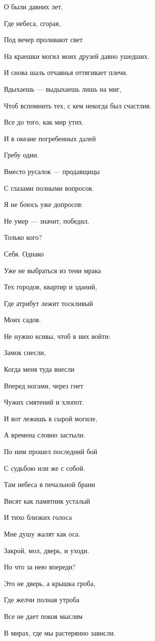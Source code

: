 \documentclass[
  a5paperpaper,
  DIV=11,
  numbers=noendperiod]{scrreprt}
\begin{document}
О были давних лет,

Где небеса, сгорая,

Под вечер проливают свет

На краешки могил моих друзей давно ушедших.

И снова шаль отчаянья оттягивает плечи.

Вдыхаешь --- выдыхаешь лишь на миг,

Чтоб вспомнить тех, с кем некогда был счастлив.

Все до того, как мир утих.

И в океане погребенных далей

Гребу один.

Вместо русалок --- продавщицы

С глазами полными вопросов.

Я не боюсь уже допросов:

Не умер --- значит, победил.

Только кого?

Себя. Однако

Уже не выбраться из тени мрака

Тех городов, квартир и зданий,

Где атрибут лежит тоскливый

Моих садов.

Не нужно ксивы, чтоб в них войти:

Замок снесли,

Когда меня туда внесли

Вперед ногами, через гнет

Чужих смятений и хлопот.

И вот лежишь в сырой могиле,

А времена словно застыли.

По ним прошел последний бой

С судьбою или же с собой.

Там небеса в печальной брани

Висят как памятник усталый

И тихо близких голоса

Мне душу жалят как оса.

Закрой, мол, дверь, и уходи.

Но что за нею впереди?

Это не дверь, а крышка гроба,

Где желчи полная утроба

Все не дает покоя мыслям

В мирах, где мы растерянно зависли.
\end{document}
